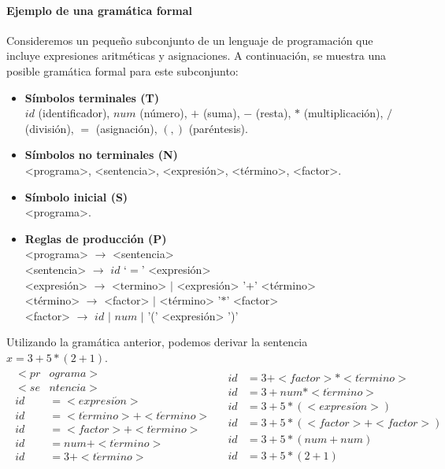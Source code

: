 \paragraph{Ejemplo de una gramática formal}
Consideremos un pequeño subconjunto de un lenguaje de programación que incluye expresiones aritméticas y asignaciones. A continuación, se muestra una posible gramática formal para este subconjunto:
\begin{itemize}
  \item \textbf{Símbolos terminales (T)} \\
  $id$ (identificador), $num$ (número), $+$ (suma), $-$ (resta), $*$ (multiplicación), $/$ (división), $=$ (asignación), $(, )$ (paréntesis).
  \item \textbf{Símbolos no terminales (N)} \\
  <programa>, <sentencia>, <expresión>, <término>, <factor>.
  \item \textbf{Símbolo inicial (S)} \\
  <programa>.
  \item \textbf{Reglas de producción (P)} \\
  <programa> $\rightarrow$ <sentencia> \\
  <sentencia> $\rightarrow$ $id$ `$=$' <expresión> \\
  <expresión> $\rightarrow$ <termino> \space $|$ <expresión> '$+$' <término> \\
  <término> $\rightarrow$ <factor> \space $|$ <término> '$*$' <factor> \\
  <factor> $\rightarrow$ $id$ \space $|$ $num$ \space $|$ '(' <expresión> ')'
\end{itemize}

Utilizando la gramática anterior, podemos derivar la sentencia $x = 3 + 5 * (2 + 1)$.
\begin{equation*}
  \begin{array}{ll}
    \begin{aligned}
      <pr&ograma> \\
      <se&ntencia> \\
      id & = <expresi\acute{o}n> \\
      id & = <t\acute{e}rmino> + <t\acute{e}rmino> \\
      id & = <factor> + <t\acute{e}rmino> \\
      id & = num + <t\acute{e}rmino> \\
      id & = 3 + <t\acute{e}rmino> \\
    \end{aligned}
    &
    \begin{aligned}
      id & = 3 + <factor> * <t\acute{e}rmino> \\
      id & = 3 + num * <t\acute{e}rmino> \\
      id & = 3 + 5 * ( <expresi\acute{o}n> ) \\
      id & = 3 + 5 * ( <factor> + <factor> ) \\
      id & = 3 + 5 * ( num + num ) \\
      id & = 3 + 5 * ( 2 + 1 )
    \end{aligned}
  \end{array}
\end{equation*}

